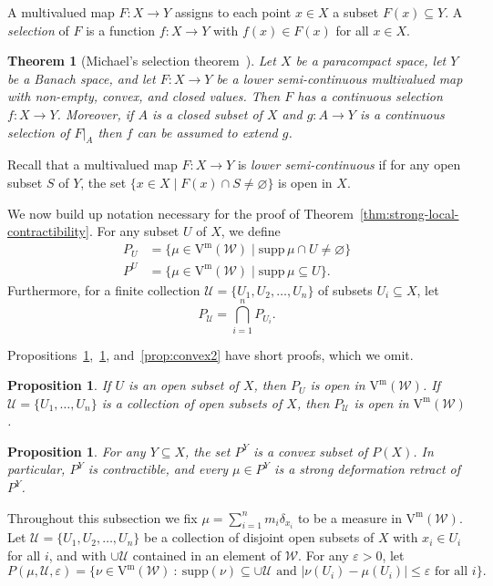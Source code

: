 \documentclass[11pt, reqno, english]{amsart}
\theoremstyle{plain}
\newtheorem{theorem}[lemma]{Theorem}
\newtheorem{proposition}[lemma]{Proposition}
\theoremstyle{definition}
\theoremstyle{myremark}
\newcommand{\cU}{\mathcal{U}}
\newcommand{\cW}{\mathcal{W}}
\newcommand{\supp}{\mathrm{supp}}
\newcommand{\vietm}[1]{\mathrm{V}^\mathrm{m}(#1)}
\begin{document}
A multivalued map $F\colon X\to Y$ assigns to each point $x\in X$ a subset $F(x)\subseteq Y$.
A \emph{selection} of $F$ is a function $f\colon X\to Y$ with $f(x)\in F(x)$ for all $x\in X$.

\begin{theorem}[Michael's selection theorem~\cite{michael1956continuous}]
\label{theorem:selection}
Let $X$ be a paracompact space, let $Y$ be a Banach space, and let $F\colon X\to Y$ be a lower semi-continuous multivalued map with non-empty, convex, and closed values.
Then $F$ has a continuous selection $f\colon X\to Y$.
Moreover, if $A$ is a closed subset of $X$ and $g\colon A\to Y$ is a continuous selection of $F|_A$ then $f$ can be assumed to extend $g$.
\end{theorem}

Recall that a multivalued map $F\colon X\to Y$ is \emph{lower semi-continuous} if for any open subset $S$ of $Y$, the set $\{x\in X\mid F(x)\cap S\ne \varnothing\}$ is open in $X$.

We now build up notation necessary for the proof of Theorem~\ref{thm:strong-local-contractibility}.
For any subset $U$ of $X$, we define
\begin{align*}
P_U &= \{ \mu\in \vietm{\cW}\mid \mathrm{supp}\, \mu \cap U\ne \varnothing\} \\
P^U &= \{ \mu\in \vietm{\cW} \mid \mathrm{supp}\, \mu \subseteq U\}.
\end{align*}
Furthermore, for a finite collection $\cU=\{U_1, U_2, \dots, U_n\}$ of subsets $U_i\subseteq X$, let
\[P_{\cU} = \bigcap_{i=1}^n P_{U_i}.\]

Propositions~\ref{prop:open},~\ref{prop:convex}, and~\ref{prop:convex2} have short proofs, which we omit.

\begin{proposition}
\label{prop:open}
If $U$ is an open subset of $X$, then $P_U$ is open in $\vietm{\cW}$.
If $\cU=\{U_1, \dots, U_n\}$ is a collection of open subsets of $X$, then $P_{\cU} $ is open in $\vietm{\cW}$.
\end{proposition}

\begin{proposition}
\label{prop:convex}
For any $Y\subseteq X$, the set $P^Y$ is a convex subset of $P(X)$.
In particular, $P^Y$ is contractible, and every $\mu\in P^Y$ is a strong deformation retract of $P^Y$.
\end{proposition}

Throughout this subsection we fix $\mu =\sum_{i=1}^n m_i \delta_{x_i}$ to be a measure in $\vietm{\cW}$.
Let $\cU=\{U_1, U_2, \dots, U_n\}$ be a collection of disjoint open subsets of $X$ with $x_i\in U_i$ for all $i$, and with $\cup\cU$ contained in an element of $\cW$.
For any $\varepsilon >0$, let
\[ P(\mu,\cU,\varepsilon) = \{ \nu \in \vietm{\cW}~:~\supp(\nu) \subseteq \cup\cU \mbox { and } | \nu(U_i) - \mu(U_i)|\le \varepsilon \mbox{ for all } i \}.\]
\end{document}
